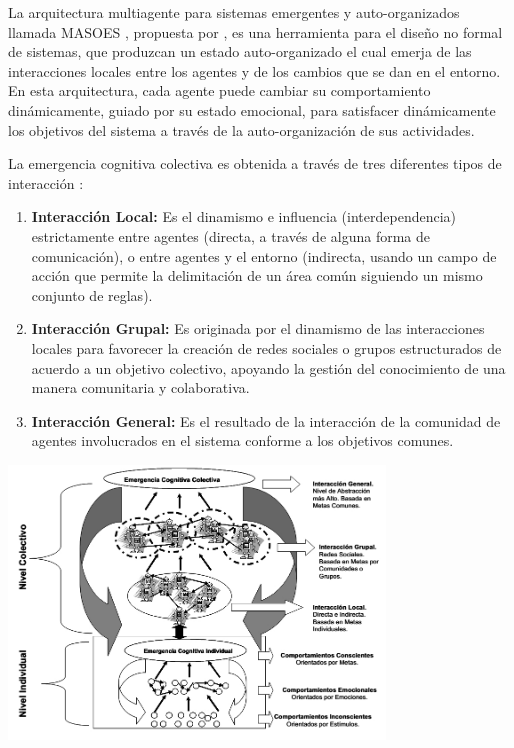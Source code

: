 
La arquitectura multiagente para sistemas emergentes y auto-organizados llamada
MASOES ,
propuesta por \cite{perozo2011}, es una herramienta para el diseño no
formal de sistemas, que produzcan un estado auto-organizado el cual emerja de
las interacciones locales entre los agentes y de los cambios que se dan en el
entorno. En esta arquitectura, cada agente puede cambiar su comportamiento
dinámicamente, guiado por su estado emocional, para satisfacer dinámicamente los
objetivos del sistema a través de la auto-organización de sus actividades.


La emergencia cognitiva colectiva es obtenida a través de tres diferentes
tipos de interacción :

\begin{enumerate}
\item \textbf{Interacción Local:} Es el dinamismo e influencia (interdependencia)
estrictamente entre agentes (directa, a través de alguna forma de comunicación),
o entre agentes y el entorno (indirecta, usando un campo de acción que permite
la delimitación de un área común siguiendo un mismo conjunto de reglas).
\item \textbf{Interacción Grupal:} Es originada por el dinamismo de las interacciones locales
para favorecer la creación de redes sociales o grupos estructurados de acuerdo a
un objetivo colectivo, apoyando la gestión del conocimiento de una manera
comunitaria y colaborativa.
\item \textbf{Interacción General:} Es el resultado de la interacción de la comunidad de
agentes involucrados en el sistema conforme a los objetivos comunes.
\end{enumerate}

\begin{ilustracion}[fuente=\cite{perozo2011}, etiqueta=arquitectura-multiagente-masoes, titulo={Arquitectura de MASOES}]
\includegraphics[width=10cm]{ilustraciones/marco-teorico/arquitectura-multiagente-masoes.jpg}
\end{ilustracion}

